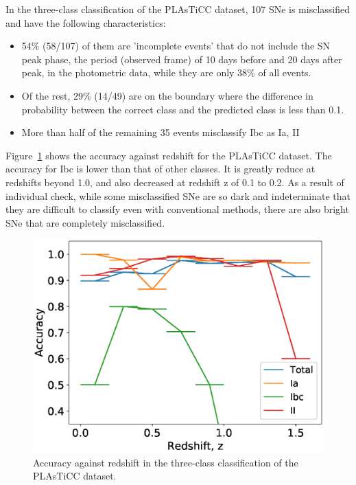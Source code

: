 \documentclass[proof]{pasj01}
\begin{document}
In the three-class classification of the PLAsTiCC dataset,
107 SNe is misclassified and have the following characteristics:
\begin{itemize}
\item 54\% (58/107) of them are 'incomplete events' that do not include the SN peak phase, the period (observed frame) of 10 days before and 20 days after peak, in the photometric data, while they are only 38\% of all events.
\item Of the rest, 29\% (14/49) are on the boundary where the difference in probability between the correct class and the predicted class is less than 0.1.
\item More than half of the remaining 35 events misclassify Ibc as Ia, II
\end{itemize}
Figure\ \ref{fig:misclass_rate_3class} shows the accuracy against redshift for the PLAsTiCC dataset.
The accuracy for Ibc is lower than that of other classes.
It is greatly reduce at redshifts beyond 1.0, and also decreased at redshift z of 0.1 to 0.2.
As a result of individual check, while some misclassified SNe are so dark and indeterminate that they are difficult to classify even with conventional methods, there are also bright SNe that are completely misclassified.
%
\begin{figure}[htbp]
  \begin{center}
     \includegraphics[width=\columnwidth]{figures/misclass_rate_plastic_3class.eps}
  \end{center}
  \caption{%
  Accuracy against redshift in the three-class classification of the PLAsTiCC dataset.
  }%
  \label{fig:misclass_rate_3class}
\end{figure}
%
%
\end{document}
